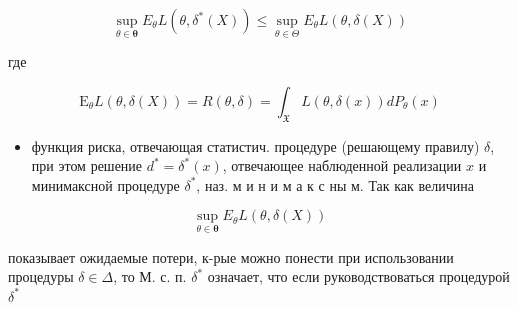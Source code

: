 \documentclass[10pt]{article}
\begin{document}
\[

\sup _{\theta \in \boldsymbol{\theta}} E_{\theta} L\left(\theta, \delta^{*}(X)\right) \leqslant \sup _{\theta \in \Theta} E_{\theta} L(\theta, \delta(X))

\]



где



\[

\mathrm{E}_{\theta} L(\theta, \delta(X))=R(\theta, \delta)=\int_{\mathfrak{X}} L(\theta, \delta(x)) d P_{\theta}(x)

\]



\begin{itemize}

  \item функция риска, отвечающая статистич. процедуре (решающему правилу) $\delta$, при этом решение $d^{*}=\delta^{*}(x)$, отвечающее наблюденной реализации $x$ и минимаксной процедуре $\delta^{*}$, наз. м и н и м а к с ны м. Так как величина

\end{itemize}



\[

\sup _{\theta \in \boldsymbol{\theta}} E_{\theta} L(\theta, \delta(X))

\]



показывает ожидаемые потери, к-рые можно понести при использовании процедуры $\delta \in \Delta$, то М. с. п. $\delta^{*}$ означает, что если руководствоваться процедурой $\delta^{*}$
\end{document}
